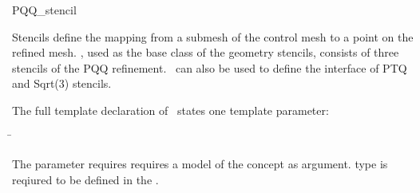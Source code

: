 
\ccRefPageBegin



\begin{ccRefClass}{PQQ_stencil}

\ccDefinition

Stencils define the mapping from a submesh of the control mesh to a 
point on the refined mesh. \ccClassTemplateName , used as the base 
class of the geometry stencils, consists of three stencils of the 
PQQ refinement. \ccClassTemplateName\ can also be used to define 
the interface of PTQ and Sqrt(3) stencils.





\ccParameters

The full template declaration of \ccClassTemplateName\ states one
template parameter:

\begin{tabbing}
 \=\\
\end{tabbing}
   
The  parameter requires requires a model of 
the  concept as argument.  
type is reqiured to be defined in the .


\end{ccRefClass}
